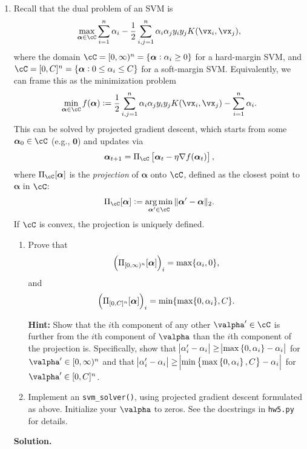 \documentclass{article}
\def\balpha{\boldsymbol{\alpha}}
\DeclareMathOperator*{\argmin}{arg\,min}
\theoremstyle{definition}
\theoremstyle{remark}
\newenvironment{Q}
{%
\clearpage
\item
}
{%
\phantom{s}%
\bigskip%
\noindent\textbf{Solution.}
}
\begin{document}
\begin{enumerate}[font={\Large\bfseries},left=0pt]
\begin{Q}
    Recall that the dual problem of an SVM is
    \begin{align*}
        \max_{\balpha\in\cC}\sum_{i=1}^{n}\alpha_i-\frac{1}{2}\sum_{i,j=1}^{n}\alpha_i\alpha_jy_iy_jK(\vx_i,\vx_j),
    \end{align*}
    where the domain $\cC=[0,\infty)^n=\{\balpha:\alpha_i\ge0\}$ for a  hard-margin SVM, and $\cC=[0,C]^n=\{\balpha:0\le\alpha_i\le C\}$ for a soft-margin SVM. Equivalently, we can frame this as the minimization problem
    \begin{align*}
        \min_{\balpha\in\cC}f(\balpha):=\frac{1}{2}\sum_{i,j=1}^{n}\alpha_i\alpha_jy_iy_jK(\vx_i,\vx_j)-\sum_{i=1}^{n}\alpha_i.
    \end{align*}
    This can be solved by projected gradient descent, which starts from some $\balpha_0\in\cC$ (e.g., $\boldsymbol{0}$) and updates via
    \begin{align*}
        \balpha_{t+1}=\Pi_{\cC}\sbr{\balpha_t-\eta\nabla f(\balpha_t)},
    \end{align*}
    where $\Pi_{\cC}[\balpha]$ is the \emph{projection} of $\balpha$ onto $\cC$, defined as the closest point to $\balpha$ in $\cC$:
    \begin{align*}
        \Pi_{\cC}[\balpha]:=\argmin_{\balpha'\in\cC}\|\balpha'-\balpha\|_2.
    \end{align*}
    If $\cC$ is convex, the projection is uniquely defined.

    \begin{enumerate}
        \item Prove that
        \begin{align*}
            \del{\Pi_{[0,\infty)^n}[\balpha]}_i=\max\{\alpha_i,0\},
        \end{align*}
        and
        \begin{align*}
            \del{\Pi_{[0,C]^n}[\balpha]}_i=\min\{\max\{0,\alpha_i\},C\}.
        \end{align*}
        
        \textbf{Hint:} Show that the $i$th component of any other $\valpha' \in \cC$ is further from the $i$th component of $\valpha$ than the $i$th component of the projection is. Specifically, show that $\abs{\alpha'_i - \alpha_i} \ge \abs{\max\cbr{0, \alpha_i} - \alpha_i}$ for $\valpha' \in [0,\infty)^n$ and that $\abs{\alpha'_i - \alpha_i} \ge \abs{\min\cbr{\max\cbr{0, \alpha_i}, C} - \alpha_i}$ for $\valpha' \in [0,C]^n$.

        \item Implement an \texttt{svm\_solver()}, using projected gradient descent formulated as above. Initialize your $\valpha$ to zeros. See the docstrings in \texttt{hw5.py} for details.
        

\end{enumerate}
\end{Q}
\end{enumerate}
\end{document}
